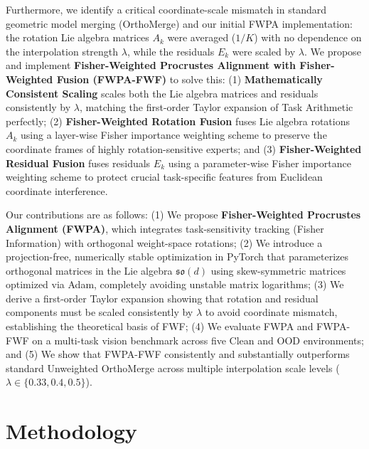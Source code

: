 \documentclass{article}
\theoremstyle{plain}
\theoremstyle{definition}
\theoremstyle{remark}
\begin{document}
Furthermore, we identify a critical coordinate-scale mismatch in standard geometric model merging (OrthoMerge) and our initial FWPA implementation: the rotation Lie algebra matrices $A_k$ were averaged ($1/K$) with no dependence on the interpolation strength $\lambda$, while the residuals $E_k$ were scaled by $\lambda$. We propose and implement \textbf{Fisher-Weighted Procrustes Alignment with Fisher-Weighted Fusion (FWPA-FWF)} to solve this: (1) \textbf{Mathematically Consistent Scaling} scales both the Lie algebra matrices and residuals consistently by $\lambda$, matching the first-order Taylor expansion of Task Arithmetic perfectly; (2) \textbf{Fisher-Weighted Rotation Fusion} fuses Lie algebra rotations $A_k$ using a layer-wise Fisher importance weighting scheme to preserve the coordinate frames of highly rotation-sensitive experts; and (3) \textbf{Fisher-Weighted Residual Fusion} fuses residuals $E_k$ using a parameter-wise Fisher importance weighting scheme to protect crucial task-specific features from Euclidean coordinate interference.

Our contributions are as follows: (1) We propose \textbf{Fisher-Weighted Procrustes Alignment (FWPA)}, which integrates task-sensitivity tracking (Fisher Information) with orthogonal weight-space rotations; (2) We introduce a projection-free, numerically stable optimization in PyTorch that parameterizes orthogonal matrices in the Lie algebra $\mathfrak{so}(d)$ using skew-symmetric matrices optimized via Adam, completely avoiding unstable matrix logarithms; (3) We derive a first-order Taylor expansion showing that rotation and residual components must be scaled consistently by $\lambda$ to avoid coordinate mismatch, establishing the theoretical basis of FWF; (4) We evaluate FWPA and FWPA-FWF on a multi-task vision benchmark across five Clean and OOD environments; and (5) We show that FWPA-FWF consistently and substantially outperforms standard Unweighted OrthoMerge across multiple interpolation scale levels ($\lambda \in \{0.33, 0.4, 0.5\}$).

\section{Methodology}
\label{sec:method}
\end{document}
